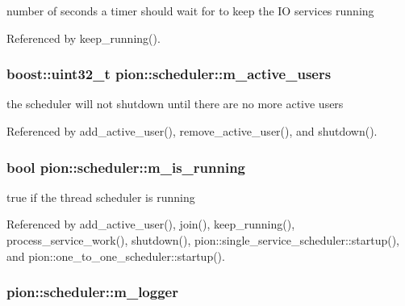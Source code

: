 number of seconds a timer should wait for to keep the I\-O services running 



Referenced by keep\-\_\-running().

\hypertarget{classpion_1_1scheduler_aa8028397b2e084c8808032ac448955b8}{
\subsubsection[{m\-\_\-active\-\_\-users}]{\setlength{\rightskip}{0pt plus 5cm}boost\-::uint32\-\_\-t pion\-::scheduler\-::m\-\_\-active\-\_\-users\hspace{0.3cm}{\ttfamily [protected]}}}\label{classpion_1_1scheduler_aa8028397b2e084c8808032ac448955b8}


the scheduler will not shutdown until there are no more active users 



Referenced by add\-\_\-active\-\_\-user(), remove\-\_\-active\-\_\-user(), and shutdown().

\hypertarget{classpion_1_1scheduler_a1fa5ef108570fe6c4a984fb1c01e8bd9}{
\subsubsection[{m\-\_\-is\-\_\-running}]{\setlength{\rightskip}{0pt plus 5cm}bool pion\-::scheduler\-::m\-\_\-is\-\_\-running\hspace{0.3cm}{\ttfamily [protected]}}}\label{classpion_1_1scheduler_a1fa5ef108570fe6c4a984fb1c01e8bd9}


true if the thread scheduler is running 



Referenced by add\-\_\-active\-\_\-user(), join(), keep\-\_\-running(), process\-\_\-service\-\_\-work(), shutdown(), pion\-::single\-\_\-service\-\_\-scheduler\-::startup(), and pion\-::one\-\_\-to\-\_\-one\-\_\-scheduler\-::startup().

\hypertarget{classpion_1_1scheduler_aa611e2e63bc69eefce43c243846d99e5}{
\subsubsection[{m\-\_\-logger}]{ pion\-::scheduler\-::m\-\_\-logger\hspace{0.3cm}{\ttfamily [protected]}}}\label{classpion_1_1scheduler_aa611e2e63bc69eefce43c243846d99e5}



